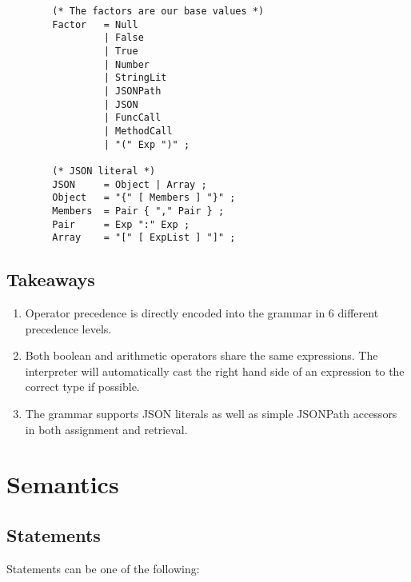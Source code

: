 \documentclass[12pt, letterpaper]{article}
\begin{document}
\begin{center}
\begin{verbatim}
        (* The factors are our base values *)
        Factor   = Null
                 | False
                 | True
                 | Number
                 | StringLit
                 | JSONPath
                 | JSON
                 | FuncCall
                 | MethodCall
                 | "(" Exp ")" ;

        (* JSON literal *)
        JSON     = Object | Array ;
        Object   = "{" [ Members ] "}" ;
        Members  = Pair { "," Pair } ;
        Pair     = Exp ":" Exp ;
        Array    = "[" [ ExpList ] "]" ;
    \end{verbatim}
\end{center}

\subsection{Takeaways}

\begin{enumerate}
    \item Operator precedence is directly encoded into the grammar in 6 different precedence levels.
    \item Both boolean and arithmetic operators share the same expressions. The interpreter will automatically cast the right hand side of an expression to the correct type if possible.
    \item The grammar supports JSON literals as well as simple JSONPath accessors in both assignment and retrieval.
\end{enumerate}

\section{Semantics}

\subsection{Statements}

Statements can be one of the following:
\end{document}
